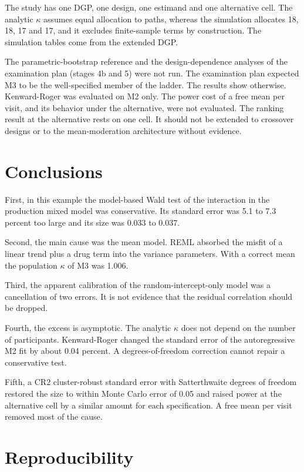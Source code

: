 \documentclass[
  11pt,
]{article}
\begin{document}
The study has one DGP, one design, one estimand and one alternative
cell. The analytic \(\kappa\) assumes equal allocation to paths,
whereas the simulation allocates 18, 18, 17 and 17, and it excludes
finite-sample terms by construction. The simulation tables come from
the extended DGP.

The parametric-bootstrap reference and the design-dependence analyses
of the examination plan (stages 4b and 5) were not run. The
examination plan expected M3 to be the well-specified member of the
ladder. The results show otherwise. Kenward-Roger was evaluated on M2
only. The power cost of a free mean per visit, and its behavior under
the alternative, were not evaluated. The ranking result at the
alternative rests on one cell. It should not be extended to
crossover designs or to the mean-moderation architecture without
evidence.

\section{Conclusions}\label{conclusions}

First, in this example the model-based Wald test of the interaction
in the production mixed model was conservative. Its standard error was
5.1 to 7.3 percent too
large and its size was 0.033 to 0.037.

Second, the main cause was the mean model. REML absorbed the misfit
of a linear trend plus a drug term into the variance parameters. With
a correct mean the population \(\kappa\) of M3 was
1.006.

Third, the apparent calibration of the random-intercept-only model
was a cancellation of two errors. It is not evidence that the
residual correlation should be dropped.

Fourth, the excess is asymptotic. The analytic \(\kappa\) does not depend
on the number of participants. Kenward-Roger changed the standard
error of the autoregressive M2 fit by about
0.04 percent. A degrees-of-freedom correction cannot
repair a conservative test.

Fifth, a CR2 cluster-robust standard error with Satterthwaite degrees
of freedom restored the size to within Monte Carlo error of 0.05 and
raised power at the alternative cell by a similar amount for each
specification. A free mean per visit removed most of the cause.

\section{Reproducibility}\label{reproducibility}
\end{document}
